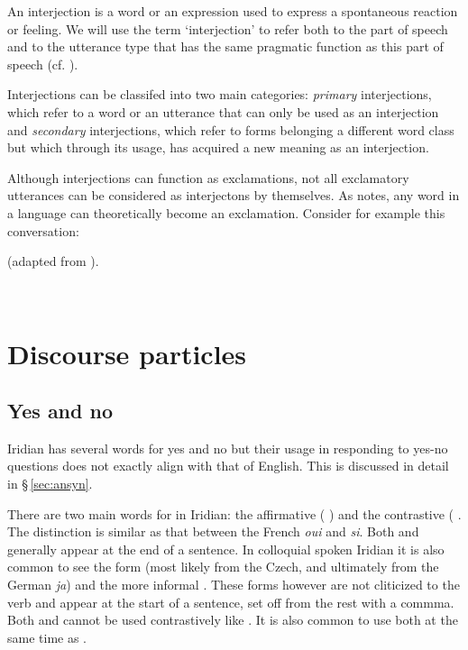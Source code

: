 An interjection is a word or an expression used to express a spontaneous reaction or feeling. We will use the term `interjection' to refer both to the part of speech and to the utterance type that has the same pragmatic function as this part of speech (cf. \cite{ameka1992}).

Interjections can be classifed into two main categories: \emph{primary} interjections, which refer to a word or an utterance that can only be used as an interjection and \emph{secondary} interjections, which refer to forms belonging a different word class but which through its usage, has acquired a new meaning as an interjection.

Although interjections can function as exclamations, not all exclamatory utterances can be considered as interjectons by themselves. As \textcite{jovanovic2004} notes, any word in a language can theoretically become an exclamation. Consider for example this conversation:

\ex (adapted from \cite{jovanovic2004}).\\

  \medskip

  \\
\xe


\section{Discourse particles}

\subsection{Yes and no}
Iridian has several words for yes and no but their usage in responding to yes-no questions does not exactly align with that of English. This is discussed in detail in \S\,\ref{sec:ansyn}.

There are two main words for  in Iridian: the affirmative  ( ) and the contrastive  ( . The distinction is similar as that between the French \emph{oui} and \emph{si}. Both  and  generally appear at the end of a sentence. In colloquial spoken Iridian it is also common to see the form  (most likely from the Czech, and ultimately from the German \emph{ja}) and the more informal . These forms however are not cliticized to the verb and appear at the start of a sentence, set off from the rest with a commma. Both  and  cannot be used contrastively like . It is also common to use both  at the same time as .

